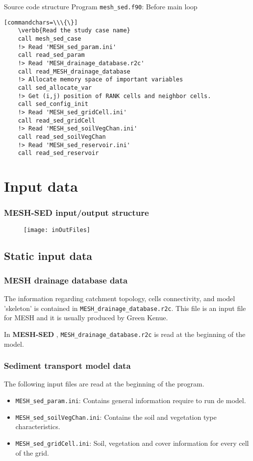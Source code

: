 \documentclass{beamer}
\newcommand{\ms}{\textbf{MESH-SED} }
\newcommand\verbb[1]{\textcolor[rgb]{0,0,1}{#1}}
\begin{document}
\begin{frame}[fragile]{Source code structure}
Program \texttt{mesh\_sed.f90}: Before main loop 
\begin{footnotesize}
\begin{verbatim}[commandchars=\\\{\}]
    \verbb{Read the study case name}
    call mesh_sed_case
    !> Read 'MESH_sed_param.ini'
    call read_sed_param
    !> Read 'MESH_drainage_database.r2c'
    call read_MESH_drainage_database
    !> Allocate memory space of important variables
    call sed_allocate_var
    !> Get (i,j) position of RANK cells and neighbor cells.
    call sed_config_init
    !> Read 'MESH_sed_gridCell.ini'
    call read_sed_gridCell
    !> Read 'MESH_sed_soilVegChan.ini'
    call read_sed_soilVegChan
    !> Read 'MESH_sed_reservoir.ini'
    call read_sed_reservoir
\end{verbatim}
\end{footnotesize}
\end{frame}


\section{Input data}
\begin{frame}\frametitle{\ms input/output structure}
\begin{figure}
\texttt{[image: inOutFiles]}
\end{figure}
\end{frame}
\subsection{Static input data}
\begin{frame}
\frametitle{MESH drainage database data}
The information regarding catchment topology, cells connectivity, and model 'skeleton' is contained in \texttt{MESH\_drainage\_database.r2c}. This file is an input file for MESH and it is usually produced by Green Kenue.

In \ms, \texttt{MESH\_drainage\_database.r2c} is read at the beginning of the model.
\end{frame}

\begin{frame}\frametitle{Sediment transport model data}
The following input files are read at the beginning of the program. 
\begin{itemize}
\item \texttt{MESH\_sed\_param.ini}: Contains general information require to run de model.
\item \texttt{MESH\_sed\_soilVegChan.ini}: Contains the soil and vegetation type characteristics.
\item \texttt{MESH\_sed\_gridCell.ini}: Soil, vegetation and cover information for every cell of the grid.
\end{itemize}
\end{frame}
\end{document}
